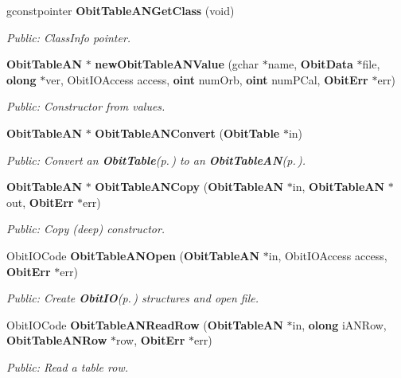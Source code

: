 \begin{CompactItemize}
gconstpointer {\bf Obit\-Table\-ANGet\-Class} (void)
\begin{CompactList}\small\item\em Public: Class\-Info pointer. \item\end{CompactList}\item 
{\bf Obit\-Table\-AN} $\ast$ {\bf new\-Obit\-Table\-ANValue} (gchar $\ast$name, {\bf Obit\-Data} $\ast$file, {\bf olong} $\ast$ver, Obit\-IOAccess access, {\bf oint} num\-Orb, {\bf oint} num\-PCal, {\bf Obit\-Err} $\ast$err)
\begin{CompactList}\small\item\em Public: Constructor from values. \item\end{CompactList}\item 
{\bf Obit\-Table\-AN} $\ast$ {\bf Obit\-Table\-ANConvert} ({\bf Obit\-Table} $\ast$in)
\begin{CompactList}\small\item\em Public: Convert an {\bf Obit\-Table}{\rm (p.\,\pageref{structObitTable})} to an {\bf Obit\-Table\-AN}{\rm (p.\,\pageref{structObitTableAN})}. \item\end{CompactList}\item 
{\bf Obit\-Table\-AN} $\ast$ {\bf Obit\-Table\-ANCopy} ({\bf Obit\-Table\-AN} $\ast$in, {\bf Obit\-Table\-AN} $\ast$out, {\bf Obit\-Err} $\ast$err)
\begin{CompactList}\small\item\em Public: Copy (deep) constructor. \item\end{CompactList}\item 
Obit\-IOCode {\bf Obit\-Table\-ANOpen} ({\bf Obit\-Table\-AN} $\ast$in, Obit\-IOAccess access, {\bf Obit\-Err} $\ast$err)
\begin{CompactList}\small\item\em Public: Create {\bf Obit\-IO}{\rm (p.\,\pageref{structObitIO})} structures and open file. \item\end{CompactList}\item 
Obit\-IOCode {\bf Obit\-Table\-ANRead\-Row} ({\bf Obit\-Table\-AN} $\ast$in, {\bf olong} i\-ANRow, {\bf Obit\-Table\-ANRow} $\ast$row, {\bf Obit\-Err} $\ast$err)
\begin{CompactList}\small\item\em Public: Read a table row. \item\end{CompactList}\item 

\end{CompactItemize}
